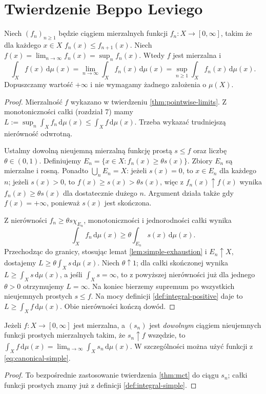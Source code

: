 \section{Twierdzenie Beppo Leviego}

\begin{twierdzenie}
\label{thm:mct}
Niech $(f_n)_{n\ge1}$ będzie ciągiem mierzalnych funkcji
$f_n:X\to[0,\infty]$, takim że dla każdego $x\in X$
$f_n(x)\le f_{n+1}(x)$. Niech
$f(x)=\lim_{n\to\infty}f_n(x)=\sup_nf_n(x)$.
Wtedy $f$ jest mierzalna i
\begin{equation}\label{eq:mct}
\int_Xf(x)\,\mathrm d\mu(x)
=\lim_{n\to\infty}\int_Xf_n(x)\,\mathrm d\mu(x)
=\sup_{n\ge1}\int_Xf_n(x)\,\mathrm d\mu(x).
\end{equation}
Dopuszczamy wartość $+\infty$ i nie wymagamy
żadnego założenia o $\mu(X)$.
\end{twierdzenie}
\begin{proof}
Mierzalność $f$ wykazano w twierdzeniu
\ref{thm:pointwise-limits}. Z monotoniczności całki
(rozdział 7) mamy
$L:=\sup_n\int_Xf_n\,\mathrm d\mu(x)\le
\int_Xf\,\mathrm d\mu(x)$.
Trzeba wykazać trudniejszą nierówność odwrotną.

Ustalmy dowolną nieujemną mierzalną funkcję prostą
$s\le f$ oraz liczbę $\theta\in(0,1)$.
Definiujemy
$E_n=\{x\in X:f_n(x)\ge\theta s(x)\}$.
Zbiory $E_n$ są mierzalne i rosną.
Ponadto $\bigcup_nE_n=X$: jeżeli $s(x)=0$,
to $x\in E_n$ dla każdego $n$; jeżeli $s(x)>0$,
to $f(x)\ge s(x)>\theta s(x)$, więc z
$f_n(x)\uparrow f(x)$ wynika $f_n(x)\ge\theta s(x)$
dla dostatecznie dużego $n$. Argument działa także
gdy $f(x)=+\infty$, ponieważ $s(x)$ jest skończona.

Z nierówności $f_n\ge\theta s\chi_{E_n}$,
monotoniczności i jednorodności całki wynika
\[
\int_Xf_n\,\mathrm d\mu(x)\ge
\theta\int_{E_n}s(x)\,\mathrm d\mu(x).
\]
Przechodząc do granicy, stosując lemat
\ref{lem:simple-exhaustion} i $E_n\uparrow X$,
dostajemy $L\ge\theta\int_Xs\,\mathrm d\mu(x)$.
Niech $\theta\uparrow1$; dla całki skończonej
wynika $L\ge\int_Xs\,\mathrm d\mu(x)$, a jeśli
$\int_Xs=\infty$, to z powyższej nierówności
już dla jednego $\theta>0$ otrzymujemy $L=\infty$.
Na koniec bierzemy supremum po wszystkich
nieujemnych prostych $s\le f$. Na mocy definicji
\ref{def:integral-positive} daje to
$L\ge\int_Xf\,\mathrm d\mu(x)$. Obie nierówności
kończą dowód.
\end{proof}

\begin{wniosek}
\label{cor:simple-approx-integral}
Jeżeli $f:X\to[0,\infty]$ jest mierzalna, a
$(s_n)$ jest \emph{dowolnym} ciągiem nieujemnych
funkcji prostych mierzalnych takim, że $s_n\uparrow f$
wszędzie, to
$\int_Xf\,\mathrm d\mu(x)=
\lim_{n\to\infty}\int_Xs_n\,\mathrm d\mu(x)$.
W szczególności można użyć funkcji z
\eqref{eq:canonical-simple}.
\end{wniosek}
\begin{proof}
To bezpośrednie zastosowanie twierdzenia
\ref{thm:mct} do ciągu $s_n$; całki funkcji prostych
znamy już z definicji \ref{def:integral-simple}.
\end{proof}

